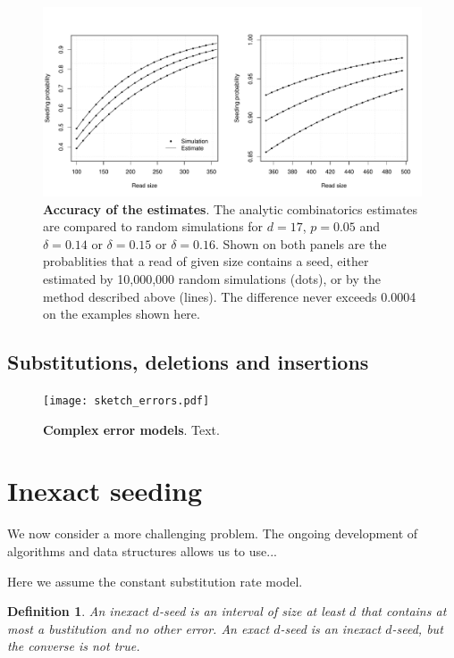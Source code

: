 \documentclass{article}
\newtheorem{definition}{Definition}
\begin{document}
\begin{figure}[h]
\centering
\includegraphics[scale=0.445]{simulpdel.pdf}
\caption{\textbf{Accuracy of the estimates}. The analytic combinatorics
estimates are compared to random simulations for $d=17$, $p=0.05$ and
$\delta=0.14$ or $\delta=0.15$ or $\delta=0.16$. Shown on both panels are
the probablities that a read of given size contains a seed, either
estimated by 10,000,000 random simulations (dots), or by the method
described above (lines). The difference never exceeds 0.0004 on the
examples shown here.}
\label{fig:simulpdel}
\end{figure}

\subsection{Substitutions, deletions and insertions}

\begin{figure}[h]
\centering
\texttt{[image: sketch\_errors.pdf]}
\caption{\textbf{Complex error models}.
Text.
}
\label{fig:sketcherr}
\end{figure}

\section{Inexact seeding}

We now consider a more challenging problem. The ongoing development of
algorithms and data structures allows us to use...

Here we assume the constant substitution rate model.

\begin{definition}
\label{def:seed}
An inexact $d$-seed is an interval of size at least $d$ that contains at
most a bustitution and no other error. An exact $d$-seed is an inexact
$d$-seed, but the converse is not true.
\end{definition}
\end{document}
